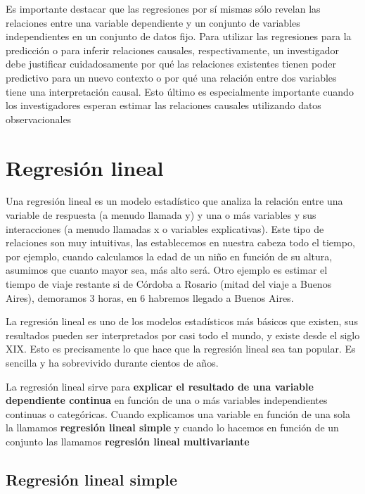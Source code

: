 \documentclass[
]{book}
\begin{document}
Es importante destacar que las regresiones por sí mismas sólo revelan las relaciones entre una variable dependiente y un conjunto de variables independientes en un conjunto de datos fijo. Para utilizar las regresiones para la predicción o para inferir relaciones causales, respectivamente, un investigador debe justificar cuidadosamente por qué las relaciones existentes tienen poder predictivo para un nuevo contexto o por qué una relación entre dos variables tiene una interpretación causal. Esto último es especialmente importante cuando los investigadores esperan estimar las relaciones causales utilizando datos observacionales

\hypertarget{regresiuxf3n-lineal}{%
\section{Regresión lineal}\label{regresiuxf3n-lineal}}

Una regresión lineal es un modelo estadístico que analiza la relación entre una variable de respuesta (a menudo llamada y) y una o más variables y sus interacciones (a menudo llamadas x o variables explicativas). Este tipo de relaciones son muy intuitivas, las establecemos en nuestra cabeza todo el tiempo, por ejemplo, cuando calculamos la edad de un niño en función de su altura, asumimos que cuanto mayor sea, más alto será. Otro ejemplo es estimar el tiempo de viaje restante si de Córdoba a Rosario (mitad del viaje a Buenos Aires), demoramos 3 horas, en 6 habremos llegado a Buenos Aires.

La regresión lineal es uno de los modelos estadísticos más básicos que existen, sus resultados pueden ser interpretados por casi todo el mundo, y existe desde el siglo XIX. Esto es precisamente lo que hace que la regresión lineal sea tan popular. Es sencilla y ha sobrevivido durante cientos de años.

La regresión lineal sirve para \textbf{explicar el resultado de una variable dependiente continua} en función de una o más variables independientes continuas o categóricas. Cuando explicamos una variable en función de una sola la llamamos \textbf{regresión lineal simple} y cuando lo hacemos en función de un conjunto las llamamos \textbf{regresión lineal multivariante}

\hypertarget{regresiuxf3n-lineal-simple}{%
\subsection{Regresión lineal simple}\label{regresiuxf3n-lineal-simple}}
\end{document}
